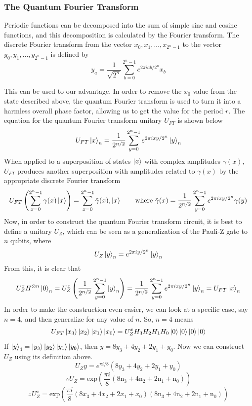 \documentclass[a4paper,10pt, titlepage, twoside]{article}
\begin{document}
\subsubsection{The Quantum Fourier Transform}
Periodic functions can be decomposed into the sum of simple sine and cosine functions, and this decomposition is calculated by the Fourier transform. The discrete Fourier transform from the vector $x_0, x_1, ..., x_{2^n -1}$ to the vector $y_0, y_1, ..., y_{2^n -1}$ is defined by
$$y_a = \frac{1}{\sqrt{2^n}} \sum _{b=0}^{2^n -1} e^{2\pi iab/2^n} x_b $$
\par
This can be used to our advantage. In order to remove the $x_0$ value from the state described above, the quantum Fourier transform is used to turn it into a harmless overall phase factor, allowing us to get the value for the period $r$. The equation for the quantum Fourier transform unitary $U_{FT}$ is shown below
$$U_{FT} \ket x _n = \frac{1}{2^{n/2}}\sum _{y=0}^{2^n -1} e^{2\pi ixy/2^n} \ket y _n$$
When applied to a superposition of states $\ket x$ with complex amplitudes $\gamma (x)$, $U_{FT}$ produces another superposition with amplitudes related to $\gamma (x)$ by the appropriate discrete Fourier transform
$$U_{FT} \left( \sum _{x=0}^{2^n -1} \gamma (x) \ket x \right) = \sum _{x=0}^{2^n -1} \tilde{\gamma} (x), \ket x \qquad \text{where } \tilde{\gamma} (x) = \frac{1}{2^{n/2}} \sum _{y=0}^{2^n -1} e^{2\pi ixy/2^n} \gamma (y)$$
Now, in order to construct the quantum Fourier transform circuit, it is best to define a unitary $U_Z$, which can be seen as a generalization of the Pauli-Z gate to $n$ qubits, where
$$U_Z \ket y _n = e^{2\pi iy/2^n} \ket y _n$$ 
From this, it is clear that
$$U_Z ^x H^{\otimes n} \ket 0 _n = U_Z ^x \left( \frac{1}{2^{n/2}} \sum _{y=0}^{2^n -1} \ket y _n \right) = \frac{1}{2^{n/2}} \sum _{y=0}^{2^n -1} e^{2\pi ixy/2^n} \ket y _n = U_{FT} \ket x _n$$
In order to make the construction even easier, we can look at a specific case, say $n = 4$, and then generalize for any value of $n$. So, $n = 4$ means
$$U_{FT} \ket{x_3}\ket{x_2}\ket{x_1}\ket{x_0} = U_Z^x H_3 H_2 H_1 H_0 \ket 0 \ket 0 \ket 0 \ket 0$$
If $\ket y _4 = \ket{y_3} \ket{y_2} \ket{y_1} \ket{y_0}$, then $y = 8y_3 + 4y_2 + 2y_1 + y_0$. Now we can construct $U_Z$ using its definition above.
$$U_Z y = e^{\pi i/8} (8y_3 + 4y_2 + 2y_1 + y_0)$$
$$\therefore U_Z = \text{exp} \left( \frac{\pi i}{8} (8\text{n}_3 + 4\text{n}_2 + 2\text{n}_1 + \text{n}_0)\right)$$
$$\therefore U_Z^x = \text{exp} \left( \frac{\pi i}{8} (8x_3 + 4x_2 + 2x_1 + x_0)(8\text{n}_3 + 4\text{n}_2 + 2\text{n}_1 + \text{n}_0)\right)$$
\end{document}
